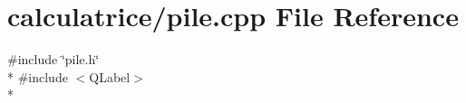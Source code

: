\section{calculatrice/pile.cpp File Reference}
\label{pile_8cpp}
{\ttfamily \#include \char`\"{}pile.\-h\char`\"{}}\\*
{\ttfamily \#include $<$Q\-Label$>$}\\*
